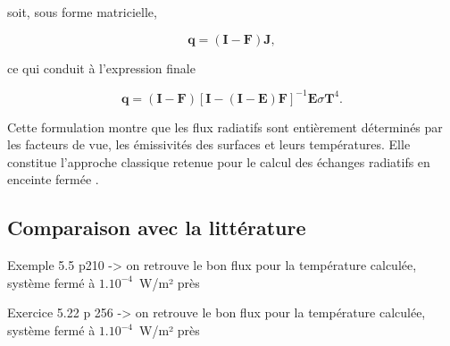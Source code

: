 soit, sous forme matricielle,

\begin{equation}
\mathbf{q}
=
(\mathbf{I}-\mathbf{F})\mathbf{J},
\end{equation}

ce qui conduit à l'expression finale

\begin{equation}
\mathbf{q}
=
(\mathbf{I}-\mathbf{F})
\left[
\mathbf{I}
-
(\mathbf{I}-\mathbf{E})\mathbf{F}
\right]^{-1}
\mathbf{E}\sigma\mathbf{T}^4.
\label{eq:q_final}
\end{equation}

Cette formulation montre que les flux radiatifs sont entièrement déterminés par les facteurs de vue, les émissivités des surfaces et leurs températures. Elle constitue l'approche classique retenue pour le calcul des échanges radiatifs en enceinte fermée \cite{howell}.

\subsection{Comparaison avec la littérature}


Exemple 5.5 p210 -> on retrouve le bon flux pour la température calculée, système fermé à $1.10^{-4}$~W/m² près

Exercice 5.22 p 256 -> on retrouve le bon flux pour la température calculée, système fermé à $1.10^{-4}$~W/m² près
